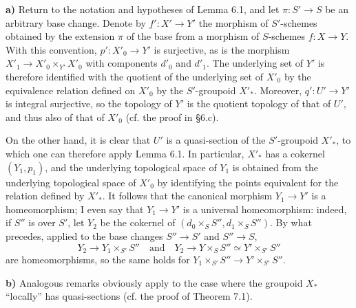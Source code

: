 \textbf{a)} Return to the notation and hypotheses of Lemma 6.1, and let $\pi:S'\to S$ be an arbitrary base change. Denote by $f':X'\to Y'$ the morphism of $S'$-schemes obtained by the extension $\pi$ of the base from a morphism of $S$-schemes $f:X\to Y$. With this convention, $p':X'_0\to Y'$ is surjective, as is the morphism $X'_1\to X'_0\times_{Y'}X'_0$ with components $d'_0$ and $d'_1$. The underlying set of $Y'$ is therefore identified with the quotient of the underlying set of $X'_0$ by the equivalence relation defined on $X'_0$ by the $S'$-groupoid $X'_*$. Moreover, $q':U'\to Y'$ is integral surjective, so the topology of $Y'$ is the quotient topology of that of $U'$, and thus also of that of $X'_0$ (cf. the proof in §6.c).

On the other hand, it is clear that $U'$ is a quasi-section of the $S'$-groupoid $X'_*$, to which one can therefore apply Lemma 6.1. In particular, $X'_*$ has a cokernel $(Y_1,p_1)$, and the underlying topological space of $Y_1$ is obtained from the underlying topological space of $X'_0$ by identifying the points equivalent for the relation defined by $X'_*$. It follows that the canonical morphism $Y_1\to Y'$ is a homeomorphism; I even say that $Y_1\to Y'$ is a universal homeomorphism: indeed, if $S''$ is over $S'$, let $Y_2$ be the cokernel of $(d_0\times_SS'',d_1\times_SS'')$. By what precedes, applied to the base changes $S''\to S'$ and $S''\to S$,
\[
Y_2\to Y_1\times_{S'}S''\quad\text{and}\quad Y_2\to Y\times_SS''\simeq Y'\times_{S'}S''
\]
are homeomorphisms, so the same holds for $Y_1\times_{S'}S''\to Y'\times_{S'}S''$.

\textbf{b)} Analogous remarks obviously apply to the case where the groupoid $X_*$ ``locally'' has quasi-sections (cf. the proof of Theorem 7.1).

